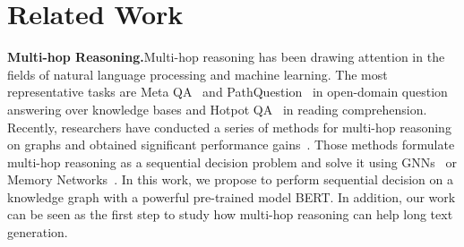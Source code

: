 \documentclass[letterpaper]{article} %
\begin{document}


\section{Related Work}
\medskip\noindent\textbf{Multi-hop Reasoning.}\hspace{1em}Multi-hop reasoning has been drawing attention in the fields of natural language processing and machine learning.
The most representative tasks are Meta QA~\citep{zhang2018variational} and PathQuestion~\citep{zhou2018interpretable} in open-domain question answering over knowledge bases and Hotpot QA~\cite{yang-et-al:hotpotqa} in reading comprehension.
Recently, researchers have conducted a series of methods for multi-hop reasoning on graphs and obtained significant performance gains~\cite{zhou2018interpretable,qiu-et-al:multihop1,DBLP:conf/emnlp/JiangB19,DBLP:conf/acl/TuWHTHZ19,ding-et-al:multihop2}. Those methods formulate multi-hop reasoning as a sequential decision problem and solve it using GNNs~\citep{gcn,gat} or Memory Networks~\citep{memoryNetworks,DBLP:conf/icml/KumarIOIBGZPS16}. In this work, we propose to perform 
sequential decision on a knowledge graph with a powerful pre-trained model BERT. In addition, our work can be seen as the first step to study how multi-hop reasoning can help long text generation.
\end{document}

